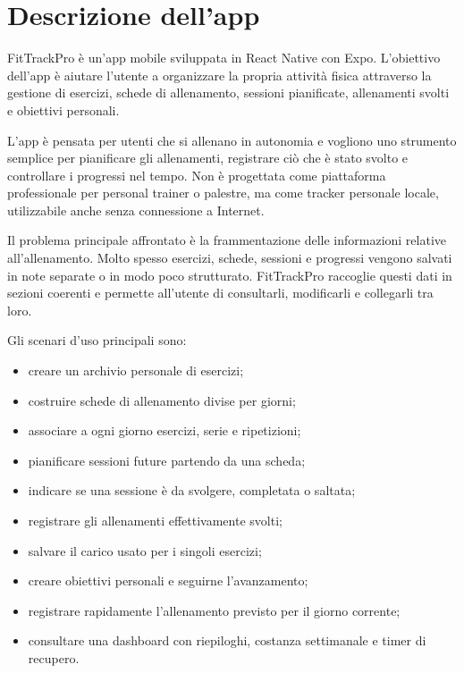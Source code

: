 \documentclass[11pt,a4paper]{article}
\begin{document}
\newpage

\newpage
\tableofcontents
\newpage















\section{ Descrizione dell'app}

FitTrackPro è un'app mobile sviluppata in React Native con Expo. L'obiettivo dell'app è aiutare l'utente a organizzare la propria attività fisica attraverso la gestione di esercizi, schede di allenamento, sessioni pianificate, allenamenti svolti e obiettivi personali.

L'app è pensata per utenti che si allenano in autonomia e vogliono uno strumento semplice per pianificare gli allenamenti, registrare ciò che è stato svolto e controllare i progressi nel tempo. Non è progettata come piattaforma professionale per personal trainer o palestre, ma come tracker personale locale, utilizzabile anche senza connessione a Internet.

Il problema principale affrontato è la frammentazione delle informazioni relative all'allenamento. Molto spesso esercizi, schede, sessioni e progressi vengono salvati in note separate o in modo poco strutturato. FitTrackPro raccoglie questi dati in sezioni coerenti e permette all'utente di consultarli, modificarli e collegarli tra loro.

Gli scenari d'uso principali sono:

\begin{itemize}
  \item creare un archivio personale di esercizi;
  \item costruire schede di allenamento divise per giorni;
  \item associare a ogni giorno esercizi, serie e ripetizioni;
  \item pianificare sessioni future partendo da una scheda;
  \item indicare se una sessione è da svolgere, completata o saltata;
  \item registrare gli allenamenti effettivamente svolti;
  \item salvare il carico usato per i singoli esercizi;
  \item creare obiettivi personali e seguirne l'avanzamento;
  \item registrare rapidamente l'allenamento previsto per il giorno corrente;
  \item consultare una dashboard con riepiloghi, costanza settimanale e timer di recupero.
\end{itemize}
\end{document}
